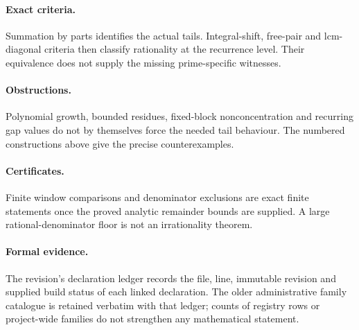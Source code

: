 \paragraph{Exact criteria.}
Summation by parts identifies the actual tails.  Integral-shift, free-pair
and lcm-diagonal criteria then classify rationality at the recurrence level.
Their equivalence does not supply the missing prime-specific witnesses.
\paragraph{Obstructions.}
Polynomial growth, bounded residues, fixed-block nonconcentration and
recurring gap values do not by themselves force the needed tail behaviour.
The numbered constructions above give the precise counterexamples.
\paragraph{Certificates.}
Finite window comparisons and denominator exclusions are exact finite
statements once the proved analytic remainder bounds are supplied.  A
large rational-denominator floor is not an irrationality theorem.
\paragraph{Formal evidence.}
The revision's declaration ledger records the file, line, immutable
revision and supplied build status of each linked declaration.  The older
administrative family catalogue is retained verbatim with that ledger;
counts of registry rows or project-wide families do not strengthen any
mathematical statement.

